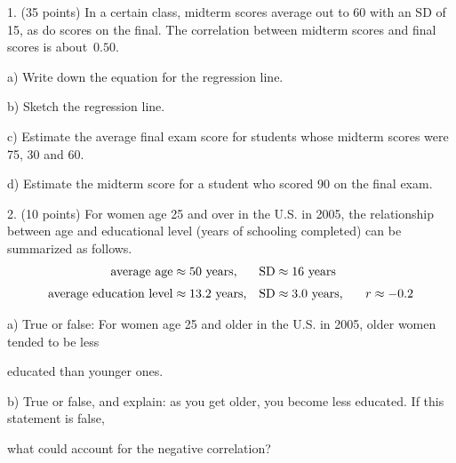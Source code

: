 \documentclass[10pt]{article}
\begin{document}
1. (35 points) In a certain class, midterm scores average out to 60 with an SD of 15, as do 
scores on the final.  The correlation between midterm scores and final scores is 
about~$0.50$.   

\hspace{20pt} a) Write down the equation for the regression line. %
\vspace{1.0in}

\hspace{20pt} b) Sketch the regression line. %
\vspace{1.25in}

\hspace{20pt} c) 
Estimate the average final exam score for students whose midterm scores were
75, 30 and 60. %
\vspace{2.75in}

\hspace{20pt} d) Estimate the midterm score for a student who scored 90 on the final exam.
\vfill
\eject
{\ }


2. (10 points) For women age 25 and over in the U.S. in 2005, the relationship between
age and educational level (years of schooling completed) can be summarized as
follows. 
\begin{align*}
\mbox{average age}         & \approx \mbox{50 years,}    & \mbox{SD} & \approx \mbox{16 years}\\[3pt]
\mbox{average education level}  & \approx \mbox{13.2 years,}  & \mbox{SD} & \approx \mbox{3.0 years,
   \hspace{15pt}} r\approx -0.2
\end{align*}

\hspace{20pt} a) True or false:  For women age 25 and older in the U.S. in 2005, older women tended 
to be less\vspace{-5pt}

\hspace{20pt} \hphantom{a) }  educated than younger ones.
\bigskip

\hspace{20pt} b) True or false, and explain:  as you get older, you become less educated.  
If this statement is false,\vspace{-4pt}

\hspace{20pt} \hphantom{a) }
what could account for the negative correlation?  
\vspace{2in}
\end{document}
